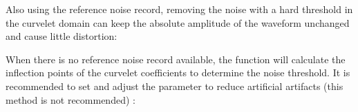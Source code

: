 \documentclass[letterpaper,10pt,english]{sphinxmanual}
\begin{document}
\begin{sphinxVerbatim}[commandchars=\\\{\}]
    
    
  
\end{sphinxVerbatim}

\sphinxAtStartPar
Also using the reference noise record, removing the noise with a hard threshold in the curvelet domain can keep the absolute amplitude of the waveform unchanged and cause little distortion:

\begin{sphinxVerbatim}[commandchars=\\\{\}]
   
\end{sphinxVerbatim}

\sphinxAtStartPar
When there is no reference noise record available, the function will calculate the inflection points of the curvelet coefficients to determine the noise threshold. It is recommended to set  and adjust the  parameter to reduce artificial artifacts (this method is not recommended) :

\begin{sphinxVerbatim}[commandchars=\\\{\}]
   
\end{sphinxVerbatim}
\end{document}
